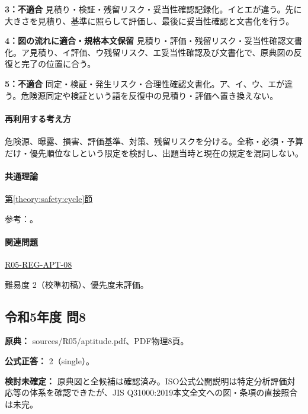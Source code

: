 \noindent\textbf{3：不適合} 見積り・検証・残留リスク・妥当性確認記録化。イとエが違う。先に大きさを見積り、基準に照らして評価し、最後に妥当性確認と文書化を行う。\par

\noindent\textbf{4：図の流れに適合・規格本文保留} 見積り・評価・残留リスク・妥当性確認文書化。ア見積り、イ評価、ウ残留リスク、エ妥当性確認及び文書化で、原典図の反復と完了の位置に合う。\par

\noindent\textbf{5：不適合} 同定・検証・発生リスク・合理性確認文書化。ア、イ、ウ、エが違う。危険源同定や検証という語を反復中の見積り・評価へ置き換えない。\par

\paragraph{再利用する考え方} 危険源、曝露、損害、評価基準、対策、残留リスクを分ける。全称・必須・予算だけ・優先順位なしという限定を検討し、出題当時と現在の規定を混同しない。

\paragraph{共通理論} \hyperref[theory:safety:cycle]{第\ref*{theory:safety:cycle}節}

\par 参考：\cite{saf_ra2006,saf_guide51}。

\paragraph{関連問題} \hyperref[q:r05-reg-apt-08]{R05-REG-APT-08}

\par 難易度 2（校準初稿）、優先度未評価。

\subsection{令和5年度 問8}
\label{q:r05-reg-apt-08}

\noindent\textbf{原典：} sources/R05/aptitude.pdf、PDF物理8頁。

\textbf{公式正答：} 2（single）。

\par\textbf{検討未確定：} 原典図と全候補は確認済み。ISO公式公開説明は特定分析評価対応等の体系を確認できたが、JIS Q31000:2019本文全文への図・条項の直接照合は未完。


